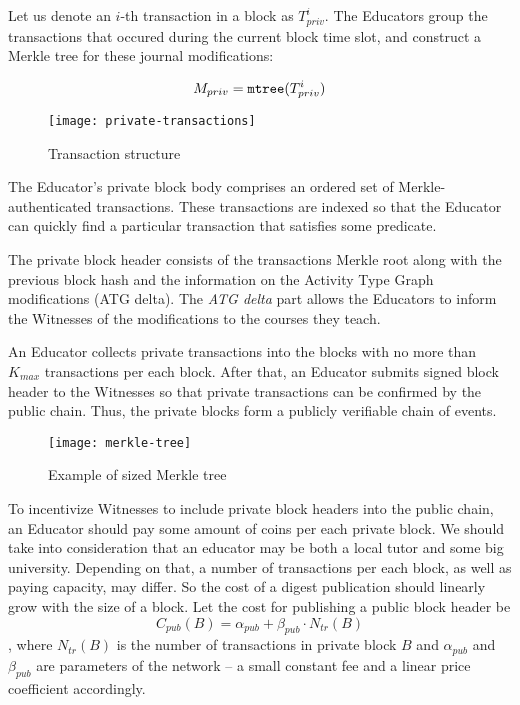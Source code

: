 Let us denote an $i$-th transaction in a block as $T_{priv}^i$. The Educators
group the transactions that occured during the current block time slot, and
construct a Merkle tree \cite{merkle1989certified} for these journal
modifications:

\begin{equation}
M_{priv} = \mathtt{mtree}(T_{priv}^i)
\end{equation}

\begin{figure}[ht]
\centering
\texttt{[image: private-transactions]}
\caption{Transaction structure}
\label{fig:private-transactions}
\end{figure}

The Educator's private block body comprises an ordered set of
Merkle-authenticated transactions. These transactions are indexed so that the
Educator can quickly find a particular transaction that satisfies some
predicate.

The private block header consists of the transactions Merkle root along with the
previous block hash and the information on the Activity Type Graph modifications
(ATG delta). The \textit{ATG delta} part allows the Educators to inform the
Witnesses of the modifications to the courses they teach.

An Educator collects private transactions into the blocks with no more than $K_{max}$
transactions per each block. After that, an Educator submits signed block header
to the Witnesses so that private transactions can be confirmed by the public
chain. Thus, the private blocks form a publicly verifiable chain of events.

\begin{figure}[ht]
\centering
\texttt{[image: merkle-tree]}
\caption{Example of sized Merkle tree}
\label{fig:merkle-tree}
\end{figure}

To incentivize Witnesses to include private block headers into the public chain,
an Educator should pay some amount of coins per each private block. We should
take into consideration that an educator may be both a local tutor and some big
university. Depending on that, a number of transactions per each block, as well
as paying capacity, may differ. So the cost of a digest publication should
linearly grow with the size of a block. Let the cost for publishing a
public block header be
\begin{equation}\label{sec:priv-chain:pub-cost-eq}
  C_{pub}(B) = \alpha_{pub} + \beta_{pub} \cdot N_{tr}(B)
\end{equation}
, where $N_{tr}(B)$ is the number of transactions in private block $B$ and
$\alpha_{pub}$ and $\beta_{pub}$ are parameters of the network -- a small
constant fee and a linear price coefficient accordingly.

